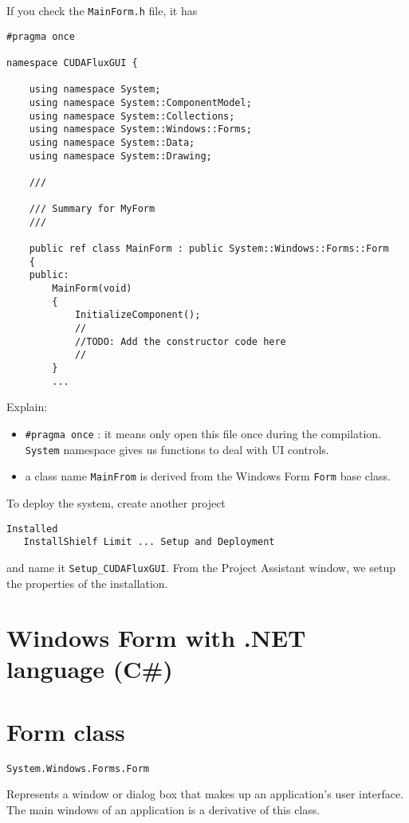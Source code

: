 If you check the \verb!MainForm.h! file, it has
\begin{verbatim}
#pragma once

namespace CUDAFluxGUI {

	using namespace System;
	using namespace System::ComponentModel;
	using namespace System::Collections;
	using namespace System::Windows::Forms;
	using namespace System::Data;
	using namespace System::Drawing;

	/// 

	/// Summary for MyForm
	/// 

	public ref class MainForm : public System::Windows::Forms::Form
	{
	public:
		MainForm(void)
		{
			InitializeComponent();
			//
			//TODO: Add the constructor code here
			//
		}
        ...

\end{verbatim}

Explain:
\begin{itemize}
  \item \verb!#pragma once! : it means only open this file once during the
  compilation. \verb!System! namespace gives us functions to deal with UI
  controls.
  \item a class name \verb!MainFrom! is derived from the Windows Form
  \verb!Form! base class.
\end{itemize}



To deploy the system, create another project 
\begin{verbatim}
Installed
   InstallShielf Limit ... Setup and Deployment
\end{verbatim}
and name it \verb!Setup_CUDAFluxGUI!. From the Project Assistant window, we
setup the properties of the installation. 

\section{Windows Form with .NET language (C\#)}

\section{Form class}
\label{sec:Form-class}

\begin{verbatim}
System.Windows.Forms.Form 
\end{verbatim}
Represents a window or dialog box that makes up an application's user interface.
The main windows of an application is a derivative of this class.

